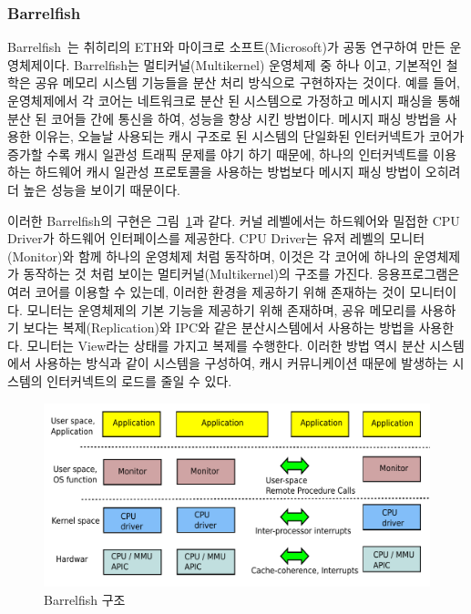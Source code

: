 \subsubsection{Barrelfish}

Barrelfish~\cite{Baumann2009Barrelfish}는 취히리의 ETH와 마이크로 소프트(Microsoft)가
공동 연구하여 만든 운영체제이다.
Barrelfish는 멀티커널(Multikernel) 운영체제 중 하나 이고, 기본적인 철학은 공유 메모리 시스템 
기능들을 분산 처리 방식으로 구현하자는 것이다.
예를 들어, 운영체제에서 각 코어는 네트워크로 분산 된 시스템으로 가정하고 메시지 패싱을 통해 분산 된 
코어들 간에 통신을 하여, 성능을 향상 시킨 방법이다. 
메시지 패싱 방법을 사용한 이유는, 오늘날 사용되는 캐시 구조로 된 시스템의 
단일화된 인터커넥트가 코어가 증가할 수록 캐시 일관성 트래픽 문제를 야기 하기 때문에,
하나의 인터커넥트를 이용하는 하드웨어 캐시 일관성 프로토콜을 사용하는 방법보다 
메시지 패싱 방법이 오히려 더 높은 성능을 보이기 때문이다. 

이러한 Barrelfish의 구현은 그림~\ref{fig:Barrelfish}과 같다.
커널 레벨에서는 하드웨어와 밀접한 CPU Driver가 하드웨어 인터페이스를 제공한다.
CPU Driver는 유저 레벨의 모니터(Monitor)와 함께 하나의 운영체제 처럼 동작하며, 
이것은 각 코어에 하나의 운영체제가 동작하는 것 처럼 보이는 멀티커널(Multikernel)의 구조를 가진다. 
응용프로그램은 여러 코어를 이용할 수 있는데, 이러한 환경을 제공하기 위해 존재하는 것이 모니터이다. 
모니터는 운영체제의 기본 기능을 제공하기 위해 존재하며, 공유 메모리를 사용하기 
보다는 복제(Replication)와 IPC와 같은 분산시스템에서 사용하는 방법을 사용한다. 
모니터는 View라는 상태를 가지고 복제를 수행한다. 
이러한 방법 역시 분산 시스템에서 사용하는 방식과 같이 시스템을 구성하여, 캐시 커뮤니케이션 때문에 발생하는 
시스템의 인터커넥트의 로드를 줄일 수 있다.

\begin{figure}[h!]
    \centering
    \includegraphics[width=1\textwidth]{fig/multikernel/multikernel}
    \caption{Barrelfish 구조}
  \label{fig:Barrelfish}
\end{figure}

